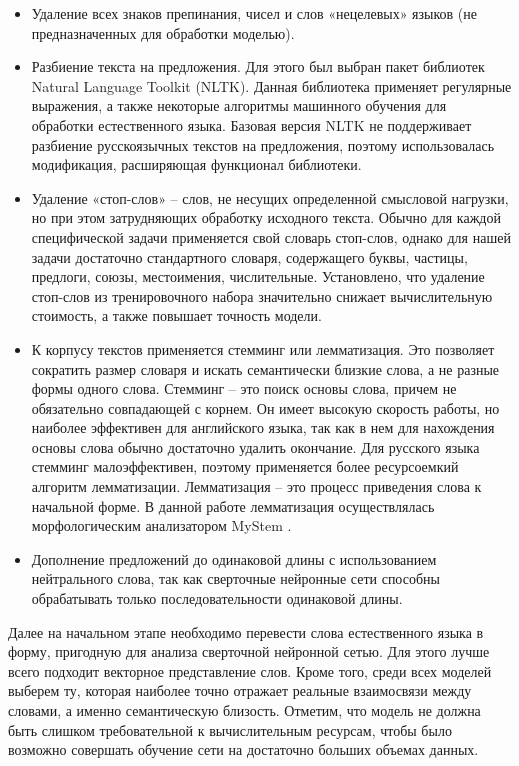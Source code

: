 \begin{itemize}
  \item Удаление всех знаков препинания, чисел и слов «нецелевых» языков (не предназначенных для обработки моделью).
  \item Разбиение текста на предложения. Для этого был выбран пакет библиотек Natural Language Toolkit (NLTK). Данная библиотека применяет регулярные выражения, а также некоторые алгоритмы машинного обучения для обработки естественного языка. Базовая версия NLTK не поддерживает разбиение русскоязычных текстов на предложения, поэтому использовалась модификация, расширяющая функционал библиотеки.
  \item Удаление «стоп-слов» – слов, не несущих определенной смысловой нагрузки, но при этом затрудняющих обработку исходного текста. Обычно для каждой специфической задачи применяется свой словарь стоп-слов, однако для нашей задачи достаточно стандартного словаря, содержащего буквы, частицы, предлоги, союзы, местоимения, числительные. Установлено, что удаление стоп-слов из тренировочного набора значительно снижает вычислительную стоимость, а также повышает точность модели.
  \item К корпусу текстов применяется стемминг или лемматизация. Это позволяет сократить размер словаря и искать семантически близкие слова, а не разные формы одного слова. Стемминг – это поиск основы слова, причем не обязательно совпадающей с корнем. Он имеет высокую скорость работы, но наиболее эффективен для английского языка, так как в нем для нахождения основы слова обычно достаточно удалить окончание. Для русского языка стемминг малоэффективен, поэтому применяется более ресурсоемкий алгоритм лемматизации. Лемматизация – это процесс приведения слова к начальной форме. В данной работе лемматизация осуществлялась морфологическим анализатором MyStem .
  \item Дополнение предложений до одинаковой длины с использованием нейтрального слова, так как сверточные нейронные сети способны обрабатывать только последовательности одинаковой длины.
\end{itemize}

Далее на начальном этапе необходимо перевести слова естественного языка в форму, пригодную для анализа сверточной нейронной сетью. 
Для этого лучше всего подходит векторное представление слов. Кроме того, среди всех моделей выберем ту, которая наиболее точно отражает 
реальные взаимосвязи между словами, а именно семантическую близость. Отметим, что модель не должна быть слишком требовательной к вычислительным 
ресурсам, чтобы было возможно совершать обучение сети на достаточно больших объемах данных.


